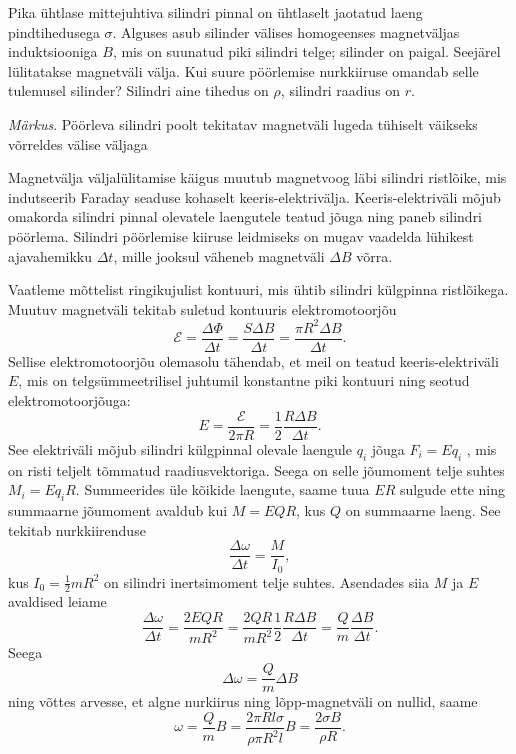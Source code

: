 
Pika ühtlase mittejuhtiva silindri pinnal on ühtlaselt jaotatud laeng pindtihedusega $\sigma$. Alguses asub silinder välises homogeenses magnetväljas induktsiooniga $B$, mis on suunatud piki silindri telge; silinder on paigal. Seejärel lülitatakse magnetväli välja. Kui suure pöörlemise nurkkiiruse omandab selle tulemusel silinder? Silindri aine tihedus on $\rho$, silindri raadius on $r$. 

\emph{Märkus}. Pöörleva silindri poolt tekitatav magnetväli lugeda tühiselt väikseks võrreldes välise väljaga

\hint
Magnetvälja väljalülitamise käigus muutub magnetvoog läbi silindri ristlõike, mis indutseerib Faraday seaduse kohaselt keeris-elektrivälja. Keeris-elektriväli mõjub omakorda silindri pinnal olevatele laengutele teatud jõuga ning paneb silindri pöörlema. Silindri pöörlemise kiiruse leidmiseks on mugav vaadelda lühikest ajavahemikku $\Delta t$, mille jooksul väheneb magnetväli $\Delta B$ võrra.

\solu
Vaatleme mõttelist ringikujulist kontuuri, mis ühtib silindri külgpinna ristlõikega. Muutuv magnetväli tekitab suletud kontuuris elektromotoorjõu
\[
\mathcal{E}=\frac{\Delta \Phi}{\Delta t}=\frac{S \Delta B}{\Delta t}=\frac{\pi R^{2} \Delta B}{\Delta t}.
\]
Sellise elektromotoorjõu olemasolu tähendab, et meil on teatud keeris-elektriväli $E$, mis on telgsümmeetrilisel juhtumil konstantne piki kontuuri ning seotud elektromotoorjõuga:
\[
E=\frac{\mathcal{E}}{2 \pi R}=\frac{1}{2} \frac{R \Delta B}{\Delta t}.
\]
See elektriväli mõjub silindri külgpinnal olevale laengule $q_i$ jõuga $F_i = Eq_i$ , mis on risti teljelt tõmmatud raadiusvektoriga. Seega on selle jõumoment telje suhtes $M_i = Eq_iR$. Summeerides üle kõikide laengute, saame tuua $ER$ sulgude ette ning summaarne jõumoment avaldub kui $M = EQR$, kus $Q$ on summaarne laeng. See tekitab nurkkiirenduse
\[
\frac{\Delta \omega}{\Delta t}=\frac{M}{I_{0}},
\]
kus $I_0 = \frac{1}{2}mR^2$ on silindri inertsimoment telje suhtes. Asendades siia $M$ ja $E$ avaldised leiame
\[
\frac{\Delta \omega}{\Delta t}=\frac{2 E Q R}{m R^{2}}=\frac{2 Q R}{m R^{2}} \frac{1}{2} \frac{R \Delta B}{\Delta t}=\frac{Q}{m} \frac{\Delta B}{\Delta t}.
\]
Seega
\[
\Delta \omega=\frac{Q}{m} \Delta B
\]
ning võttes arvesse, et algne nurkiirus ning lõpp-magnetväli on nullid, saame
\[
\omega=\frac{Q}{m} B=\frac{2 \pi R l \sigma}{\rho \pi R^{2} l} B=\frac{2 \sigma B}{\rho R}.
\]
\probend